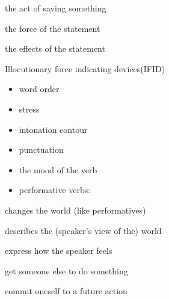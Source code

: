 \documentclass[headrule,footrule]{foils}
\begin{document}
\begin{description}
\item {} the act of saying something
\item {} the force of the statement 
\item {} the effects of the statement
\end{description}
Illocutionary force indicating devices(IFID)
\begin{itemize}
\item   word order
\item    stress
\item    intonation contour
\item    punctuation
\item    the mood of the verb
\item     performative verbs:  
\end{itemize}

  \begin{description}
  \item {} changes the world (like performatives)
  \item {} describes the (speaker's view of the) world 
  \item {}  express how the speaker feels
  \item {} get someone else to do something
  \item {} commit oneself to a future action
  \end{description}


\end{document}

